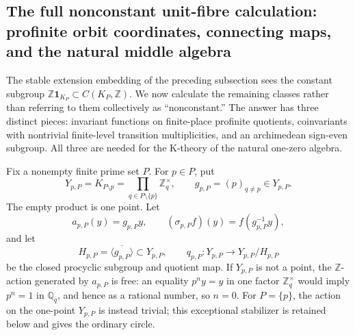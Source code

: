 \subsection{The full nonconstant unit-fibre calculation: profinite orbit
coordinates, connecting maps, and the natural middle algebra}
\label{subsec:nonconstant-unit-fibre-k-theory}

The stable extension embedding of the preceding subsection sees the constant
subgroup
\(\mathbb Z\mathbf 1_{K_P}\subset C(K_P,\mathbb Z)\).  We now calculate the
remaining classes rather than referring to them collectively as
``nonconstant.''  The answer has three distinct pieces: invariant functions
on finite-place profinite quotients, coinvariants with nontrivial finite-level
transition multiplicities, and an archimedean sign-even subgroup.  All three
are needed for the K-theory of the natural one-zero algebra.

Fix a nonempty finite prime set \(P\).  For \(p\in P\), put
\begin{equation}
 Y_{p,P}=K_{P\setminus p}
 =\prod_{q\in P\setminus\{p\}}\mathbb Z_q^\times,
 \qquad
 g_{p,P}=(p)_{q\ne p}\in Y_{p,P}.
 \label{eq:unit-fibre-Y-and-g}
\end{equation}
The empty product is one point.  Let
\begin{equation}
 a_{p,P}(y)=g_{p,P}y,
 \qquad
 (\sigma_{p,P}f)(y)=f(g_{p,P}^{-1}y),
 \label{eq:unit-fibre-translation-automorphism}
\end{equation}
and let
\begin{equation}
 H_{p,P}=\overline{\langle g_{p,P}\rangle}\subset Y_{p,P},
 \qquad
 q_{p,P}:Y_{p,P}\longrightarrow Y_{p,P}/H_{p,P}
 \label{eq:unit-fibre-procyclic-closure}
\end{equation}
be the closed procyclic subgroup and quotient map.  If \(Y_{p,P}\) is not a
point, the \(\mathbb Z\)-action generated by \(a_{p,P}\) is free: an equality
\(p^ny=y\) in one factor \(\mathbb Z_q^\times\) would imply
\(p^n=1\) in \(\mathbb Q_q\), and hence as a rational number, so \(n=0\).
For \(P=\{p\}\), the action on the one-point \(Y_{p,P}\) is instead trivial;
this exceptional stabilizer is retained below and gives the ordinary circle.

